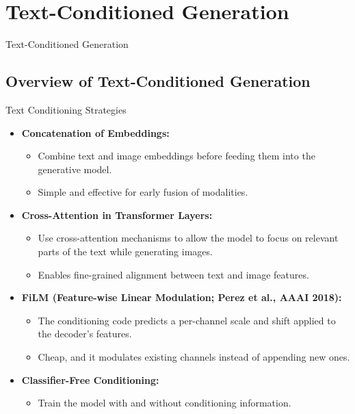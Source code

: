 \section{Text-Conditioned Generation}
\begin{frame}{}
    \LARGE Text-Conditioned Generation
\end{frame}

\subsection{Overview of Text-Conditioned Generation}
\begin{frame}[allowframebreaks]{Text Conditioning Strategies}
    \begin{itemize}
        \item \textbf{Concatenation of Embeddings:}
        \begin{itemize}
            \item Combine text and image embeddings before feeding them into the generative model.
            \item Simple and effective for early fusion of modalities.
        \end{itemize}
        \item \textbf{Cross-Attention in Transformer Layers:}
        \begin{itemize}
            \item Use cross-attention mechanisms to allow the model to focus on relevant parts of the text while generating images.
            \item Enables fine-grained alignment between text and image features.
        \end{itemize}
    \end{itemize}
\framebreak
    \begin{itemize}
        \item \textbf{FiLM (Feature-wise Linear Modulation; Perez et al., AAAI 2018):}
        \begin{itemize}
            \item The conditioning code predicts a per-channel scale and shift applied to the decoder's features.
            \item Cheap, and it modulates existing channels instead of appending new ones.
        \end{itemize}
        \item \textbf{Classifier-Free Conditioning:}
        \begin{itemize}
            \item Train the model with and without conditioning information.

\end{itemize}
\end{itemize}
\end{frame}
